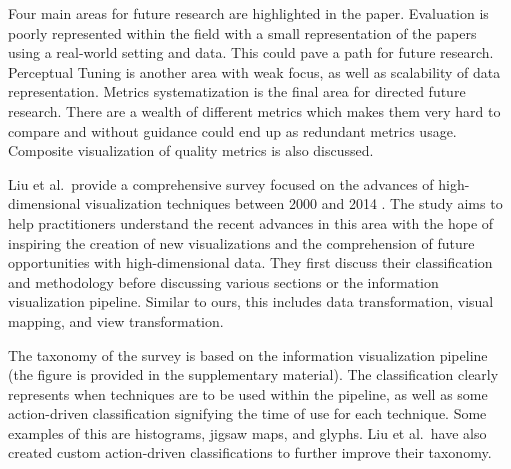 Four main areas for future research are highlighted in the paper. Evaluation is poorly represented within the field with a small representation of the papers using a real-world setting and data. This could pave a path for future research. Perceptual Tuning is another area with weak focus, as well as scalability of data representation. Metrics systematization is the final area for directed future research. There are a wealth of different metrics which makes them very hard to compare and without guidance could end up as redundant metrics usage. Composite visualization of quality metrics is also discussed.

Liu et al.\ provide a comprehensive survey focused on the advances of high-dimensional visualization techniques between 2000 and 2014 \cite{liu2015visualising}. The study aims to help practitioners understand the recent advances in this area with the hope of inspiring the creation of new visualizations and the comprehension of future opportunities with high-dimensional data.
They first discuss their classification and methodology before discussing various sections or the information visualization pipeline. Similar to ours, this includes data transformation, visual mapping, and view transformation.

The taxonomy of the survey is based on the information visualization pipeline (the figure is provided in the supplementary material). The classification clearly represents when techniques are to be used within the pipeline, as well as some action-driven classification signifying the time of use for each technique. Some examples of this are histograms, jigsaw maps, and glyphs. Liu et al.\ have also created custom action-driven classifications to further improve their taxonomy.

